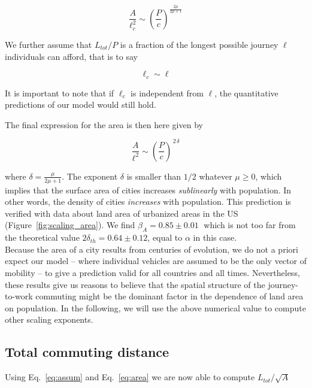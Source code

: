 \begin{equation}
    \frac{A}{\ell_c^2} \sim \left( \frac{P}{c} \right)^{\frac{2 \mu}{2\mu+1}}
\end{equation}

We further assume that $L_{tot} / P$ is a fraction of the longest possible
journey $\ell$ individuals can afford, that is to say 

\begin{equation}
    \ell_c \sim \ell
\end{equation}

It is important to note that if $\ell_c$ is independent from $\ell$, the
quantitative predictions of our model would still hold. 

The final expression for the area is then here given by

\begin{equation}
    \frac{A}{\ell^2} \sim \left( \frac{P}{c} \right)^{\,2\,\delta}
    \label{eq:area}
\end{equation}

where $\delta=\frac{\mu}{2\mu+1}$. The exponent $\delta$ is smaller than $1/2$
whatever $\mu\geq 0$, which implies that the surface area of cities increases
\emph{sublinearly} with population. In other words, the density of cities
\emph{increases}  with population. This prediction is verified with data about
land area of urbanized areas in the US (Figure~\ref{fig:scaling_area}). We find
$\beta_A = 0.85 \pm 0.01\;$ which is not too far from the
theoretical value $2\delta_{th} = 0.64 \pm 0.12$, equal to
$\alpha$ in this case.\\

Because the area of a city results from centuries of evolution, we do
not a priori expect our model -- where individual vehicles are assumed to be the
only vector of mobility -- to give a prediction valid for all countries and all
times. Nevertheless, these results give us reasons to believe that the spatial
structure of the journey-to-work commuting might be the dominant factor
in the dependence of land area on population. In the following, we will use the
above numerical value to compute other scaling exponents.


\subsection{Total commuting distance}

Using Eq.~\ref{eq:assum} and Eq.~\ref{eq:area} we are now able to compute $L_{tot}/\sqrt{A}$

